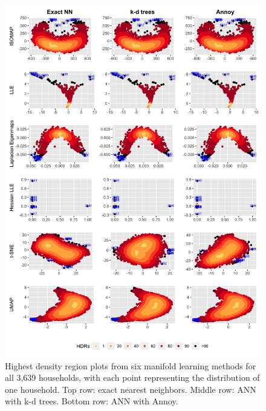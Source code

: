 \documentclass{article}
\begin{document}
\begin{figure}

{\centering \includegraphics[width=1\linewidth]{figures/hdr10_compare4ml_kdtreeannoy_allids_nt50_3639id_336tow_100length_transpose} 

}

\caption{Highest density region plots from six manifold learning methods for all 3,639 households, with each point representing the distribution of one household. Top row: exact nearest neighbors. Middle row: ANN with k-d trees. Bottom row: ANN with Annoy.}\label{fig:allidhdr}
\end{figure}
\end{document}
